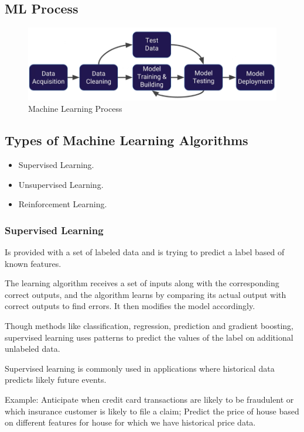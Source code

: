 \documentclass{article}
\begin{document}
\subsection{ML Process}
\begin{figure}[H]
\includegraphics[width=\linewidth]{pic/ML-process.png}
\caption{Machine Learning Process}
\centering
\end{figure}

\subsection{Types of Machine Learning Algorithms}
\begin{itemize}
	\item Supervised Learning.
	\item Unsupervised Learning.
	\item Reinforcement Learning.
\end{itemize}

\subsubsection{Supervised Learning}
\par Is provided with a set of labeled data and is trying to predict a label based of known features.

\par The learning algorithm receives a set of inputs along with the corresponding correct outputs, and the algorithm learns by comparing its actual output with correct outputs to find errors. It then modifies the model accordingly.

\par Though methods like classification, regression, prediction and gradient boosting, supervised learning uses patterns to predict the values of the label on additional unlabeled data.

\par Supervised learning is commonly used in applications where historical data predicts likely future events.

\par Example: Anticipate when credit card transactions are likely to be fraudulent or which insurance customer is likely to file a claim; Predict the price of house based on different features for house for which we have historical price data.
\end{document}
